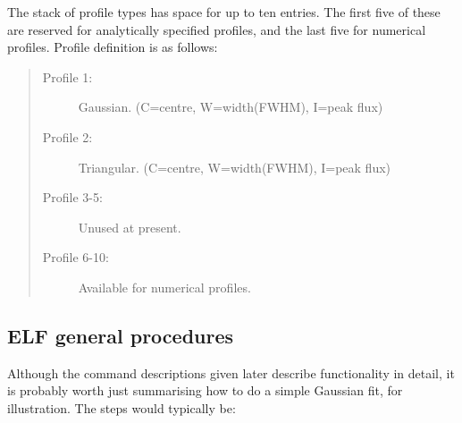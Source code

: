 \documentclass[twoside,11pt]{article}
\renewcommand{\_}{\texttt{\symbol{95}}}
\newenvironment{dipdesc}{\begin{description}}{\end{description}}
\newcommand{\dipitem}[2]{ \item[{#1}] {#2} }
\newenvironment{dipdesc}{\begin{itemize}}{\end{itemize}}
\newcommand{\dipitem}[2]{ \item {\bf{#1}} {#2} }
\begin{document}
The stack of profile types has space for up to ten entries. The first
five of these are reserved for analytically specified profiles, and
the last five for numerical profiles. Profile definition is as
follows:

\begin{quote}
\begin{dipdesc}
\dipitem {Profile 1:} {Gaussian. (C=centre, W=width(FWHM), I=peak flux)}
\dipitem {Profile 2:} {Triangular. (C=centre, W=width(FWHM), I=peak flux)}
\dipitem {Profile 3-5:} {Unused at present.}
\dipitem {Profile 6-10:} {Available for numerical profiles.}
\end{dipdesc}
\end{quote}

\subsection {ELF general procedures}

Although the command descriptions given later describe functionality
in detail, it is probably worth just summarising how to do a simple
Gaussian fit, for illustration. The steps would typically be:
\end{document}
